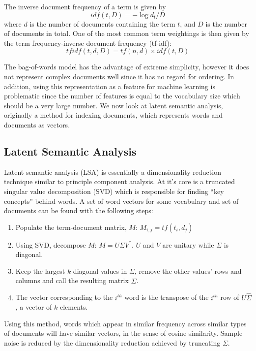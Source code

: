 The inverse document frequency of a term is given by
\begin{equation}
idf(t,D) = -\log d_t/D
\end{equation}
where $d$ is the number of documents containing the term $t$, and $D$ is the number of documents in total.  One of the most common term weightings is then given by the term frequency-inverse document frequency (tf-idf):
\begin{equation}
tfidf(t,d,D) = tf(n,d) \times idf(t,D)
\end{equation}

The bag-of-words model has the advantage of extreme simplicity, however it does not represent complex documents well since it has no regard for ordering.  In addition, using this representation as a feature for machine learning is problematic since the number of features is equal to the vocabulary size which should be a very large number.  We now look at latent semantic analysis, originally a method for indexing documents, which represents words and documents as vectors.

\subsection{Latent Semantic Analysis}
Latent semantic analysis (LSA) is essentially a dimensionality reduction technique similar to principle component analysis.  At it's core is a truncated singular value decomposition (SVD) which is responsible for finding ``key concepts'' behind words.  A set of word vectors for some vocabulary and set of documents can be found with the following steps:

\begin{enumerate}
\item Populate the term-document matrix, $M$: $M_{i,j} = tf(t_i,d_j)$
\item Using SVD, decompose $M$: $M = U\Sigma V^*$.  $U$ and $V$ are unitary while $\Sigma$ is diagonal.
\item Keep the largest $k$ diagonal values in $\Sigma$, remove the other values' rows and columns and call the resulting matrix $\hat{\Sigma}$.
\item The vector corresponding to the $i^{th}$ word is the transpose of the $i^{th}$ row of $U\hat{\Sigma}$, a vector of $k$ elements.
\end{enumerate}
\noindent
Using this method, words which appear in similar frequency across similar types of documents will have similar vectors, in the sense of cosine similarity.  Sample noise is reduced by the dimensionality reduction achieved by truncating $\Sigma$.

